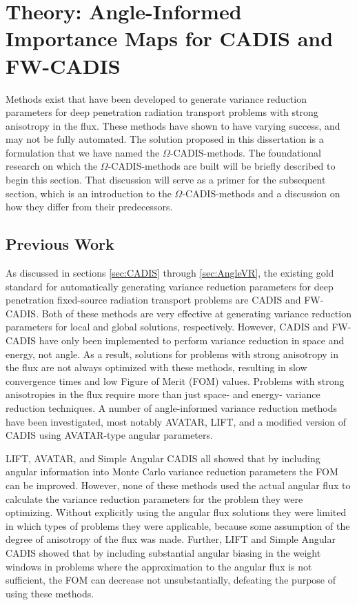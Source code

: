 \section{Theory: Angle-Informed Importance Maps for CADIS and FW-CADIS}
\label{sec:methodtheory}

Methods exist that have been developed to generate
variance reduction parameters
for deep penetration radiation transport problems with strong anisotropy in the
flux. These methods have shown to have varying success, and may not be fully
automated. The solution proposed in this dissertation is a formulation that we
have named the $\Omega$-CADIS-methods. The foundational research
on which the $\Omega$-CADIS-methods are built will be briefly described to begin this
section. That discussion will serve as a primer for the subsequent section, which
is an introduction to the $\Omega$-CADIS-methods and a discussion on how they differ
from their predecessors.

\subsection{Previous Work}
\label{sec:omegabknd}

As discussed in sections \ref{sec:CADIS}
through \ref{sec:AngleVR}, the existing gold standard for automatically
generating variance reduction parameters for deep penetration
fixed-source radiation transport problems are
CADIS and FW-CADIS. Both of these methods are very effective at
generating variance reduction parameters for local and global solutions,
respectively. However, CADIS and FW-CADIS have only been implemented
to perform variance reduction in
space and energy, not angle. As a result, solutions for problems with
strong anisotropy in the flux are not always optimized with these methods,
resulting in slow convergence times and low Figure of Merit (FOM) values.
Problems with strong anisotropies in the flux require more than just
space- and energy- variance reduction techniques.
A number of angle-informed variance reduction methods have been
investigated, most notably AVATAR, LIFT, and a modified version of
CADIS using AVATAR-type angular parameters.

LIFT, AVATAR, and Simple Angular CADIS all showed that by including angular
information into Monte Carlo variance reduction parameters the FOM can be
improved. However, none of these methods used the actual angular flux to
calculate the variance reduction parameters for the problem they were
optimizing. Without explicitly using the angular flux solutions they were
limited in which types of problems they were applicable, because some assumption
of the degree of anisotropy of the flux was made. Further, LIFT and
Simple Angular CADIS showed that by including substantial angular biasing in the
weight windows in problems where the approximation to the angular flux is not
sufficient, the FOM can decrease not unsubstantially, defeating the purpose of using
these methods.

